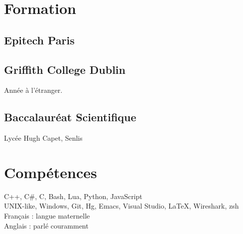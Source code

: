 \documentclass[]{hieudo-build}
\begin{document}
\begin{minipage}[t]{0.34\textwidth} 

\section{Formation} 

\subsection{Epitech Paris}
\sectionsep

\subsection{Griffith College Dublin}
Année à l'étranger.
\sectionsep

\subsection{Baccalauréat Scientifique}
Lycée Hugh Capet, Senlis
\sectionsep

\section{Compétences}
C++, C\#, C, Bash, Lua, Python, JavaScript \\ 

UNIX-like, Windows, Git, Hg, Emacs, Visual Studio, LaTeX, Wireshark, zsh \\ 

Français : langue maternelle \\
Anglais : parlé couramment \\

\sectionsep


\end{minipage}
\end{document}
